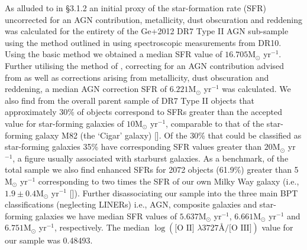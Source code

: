 As alluded to in §3.1.2 an initial proxy of the star-formation rate (SFR) uncorrected for an AGN contribution, metallicity, dust obscuration and reddening was calculated for the entirety of the Ge+2012 DR7 Type II AGN sub-sample using the method outlined in \cite{Kennicutt_1998} using spectroscopic measurements from DR10. Using the basic \cite{Kennicutt_1998} method we obtained a median SFR value of $16.705\text{M}_{\odot}$ yr$^{-1}$. Further utilising the method of \cite{Kewley_2004}, correcting for an AGN contribution advised from \cite{2006ApJ...642..702K} as well as corrections arising from metallicity, dust obscuration and reddening, a median AGN correction SFR of $6.221\text{M}_{\odot}$ yr$^{-1}$ was calculated. We also find from the overall parent sample of DR7 Type II objects that approximately 30\% of objects correspond to SFRs greater than the accepted value for star-forming galaxies of $10\text{M}_{\odot}$ yr$^{-1}$, comparable to that of the star-forming galaxy M82 (the ‘Cigar’ galaxy) [\cite{2009ApJ...706.1364F}]. Of the 30\% that could be classified as star-forming galaxies 35\% have corresponding SFR values greater than $20\text{M}_{\odot}$ yr$^{-1}$, a figure usually associated with starburst galaxies. As a benchmark, of the total sample we also find enhanced SFRs for 2072 objects (61.9\%) greater than 5 M$_{\odot}$ yr$^{-1}$ corresponding to two times the SFR of our own Milky Way galaxy (i.e., $1.9\pm{0.4}\text{M}_{\odot}$ yr$^{-1}$ [\cite{2011AJ....142..197C}]). Further disassociating our sample into the three main BPT classifications (neglecting LINERs) i.e., AGN, composite galaxies and star-forming galaxies we have median SFR values of $5.637\text{M}_{\odot}$ yr$^{-1}$, $6.661\text{M}_{\odot}$ yr$^{-1}$ and $6.751\text{M}_{\odot}$ yr$^{-1}$, respectively. The median $\log{(\text{[O II] }{\lambda}3727Å\text{/[O III]})}$ value for our sample was 0.48493.